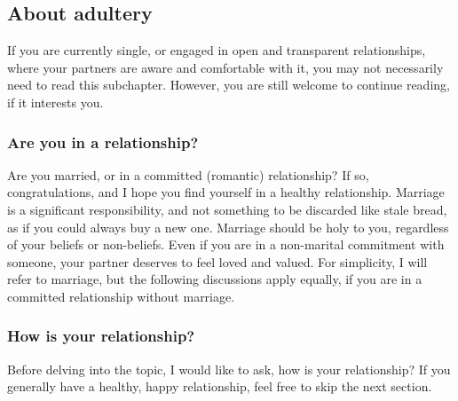 \documentclass[10pt,a5paper]{article}
\begin{document}
	\subsection{About adultery}
		If you are currently single,
		or engaged in open and transparent relationships,
		where your partners are aware and comfortable with it,
		you may not necessarily need to read this subchapter.
		However,
		you are still welcome to continue reading,
		if it interests you.

	\subsubsection{Are you in a relationship?}
		Are you married,
		or in a committed (romantic) relationship?
		If so,
		congratulations,
		and I hope you find yourself in a healthy relationship.
		Marriage is a significant responsibility,
		and not something to be discarded like stale bread,
		as if you could always buy a new one.
		Marriage should be holy to you,
		regardless of your beliefs or non-beliefs.
		Even if you are in a non-marital commitment with someone,
		your partner deserves to feel loved and valued.
		For simplicity,
		I will refer to marriage,
		but the following discussions apply equally,
		if you are in a committed relationship without marriage.

	\subsubsection{How is your relationship?}
		Before delving into the topic,
		I would like to ask,
		how is your relationship?
		If you generally have a healthy,
		happy relationship,
		feel free to skip the next section.
\end{document}

